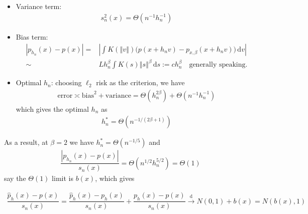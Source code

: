 \documentclass[11pt,a4paper]{ctexart}
\numberwithin{equation}{section}%
\begin{document}
\begin{enumerate}[topsep=2pt,itemsep=2pt]
    
    
    
    
\end{enumerate}

\subsection{}

\begin{itemize}[topsep=2pt,itemsep=0pt]
    \item Variance term:
    \begin{align*}
         s_n^2(x) = \Theta( n^{-1}h_n^{-1} )
    \end{align*}
    \item Bias term:
    \begin{align*}
         \left\vert p_{h_n}(x)-p(x) \right\vert =& \left\vert \int K(\left\Vert v \right\Vert ) \big(p(x+h_nv) - p_{x,\beta }(x+h_nv)\big) \,\mathrm{d}v \right\vert \\
         \sim& Lh_n^\beta \int K(s)\left\Vert s \right\Vert ^\beta \,\mathrm{d}s  := ch_n^\beta \quad \text{generally speaking.}
    \end{align*}
    \item Optimal $ h_n $: choosing $ \ell_2 $ risk as the criterion, we have
    \begin{align*}
        \mathrm{ error } \asymp \mathrm{ bias }^2 + \mathrm{ variance } = \Theta( h_n^{2\beta } ) + \Theta( n^{-1}h_n^{-1} )
    \end{align*}
    which gives the optimal $ h_n $ as 
    \begin{align*}
        h_n^* = \Theta( n^{-1/(2\beta +1)} ) 
    \end{align*}
    
\end{itemize}

As a result, at $ \beta =2 $ we have $ h_n^* = \Theta (n^{-1/5}) $ and
\begin{align*}
    \dfrac{ \left\vert p_{h_n}(x)-p(x) \right\vert }{ s_n(x) } = \Theta( n^{1/2}h_n^{5/2} ) = \Theta(1) 
\end{align*}
say the $ \Theta(1) $ limit is $ b(x) $, which gives


\begin{align*}
    \dfrac{ \hat{p}_h(x)- p(x) }{ s_n(x) } = \dfrac{ \hat{p}_h(x)- p_h(x) }{ s_n(x) } + \dfrac{ p_h(x)- p(x) }{ s_n(x) } \xrightarrow[]{\mathrm{d}} N(0,1) + b(x) = N(b(x),1)
\end{align*}
\end{document}

